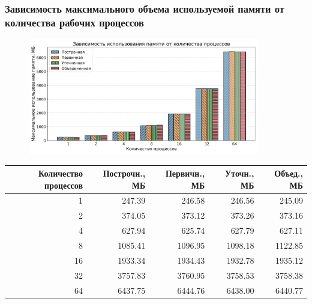 \documentclass[gray]{beamer}
\begin{document}
\begin{frame}
    \frametitle{Зависимость максимального объема используемой памяти от количества рабочих процессов}
    \begin{figure}[H]
        \centering
        \includegraphics[width=0.9\textwidth]{diag/pama_bar.pdf}
    \end{figure}

    \vspace{-0.5cm}
    \tiny
    \begin{center}
        \begin{tabular}{|r|r|r|r|r|}
            \hline
            \textbf{Количество процессов} & \textbf{Построчн.}, МБ & \textbf{Первичн.}, МБ & \textbf{Уточн.}, МБ & \textbf{Объед., МБ} \\ \hline
            1 & 247.39 & 246.58 & 246.56 & 245.09 \\ \hline
            2 & 374.05 & 373.12 & 373.26 & 373.16 \\ \hline
            4 & 627.94 & 625.74 & 627.79 & 627.11 \\ \hline
            8 & 1085.41 & 1096.95 & 1098.18 & 1122.85 \\ \hline
            16 & 1933.34 & 1934.43 & 1932.78 & 1935.12 \\ \hline
            32 & 3757.83 & 3760.95 & 3758.53 & 3758.38 \\ \hline
            64 & 6437.75 & 6444.76 & 6438.00 & 6440.77 \\ \hline
        \end{tabular}
    \end{center}
\end{frame}
\end{document}
